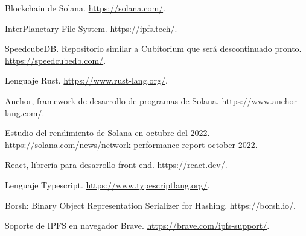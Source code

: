 
\begin{thebibliography}{99}

Blockchain de Solana. \url{https://solana.com/}.

InterPlanetary File System. \url{https://ipfs.tech/}.

SpeedcubeDB. Repositorio similar a Cubitorium que será descontinuado pronto. \url{https://speedcubedb.com/}.

Lenguaje Rust. \url{https://www.rust-lang.org/}.

Anchor, framework de desarrollo de programas de Solana. \url{https://www.anchor-lang.com/}.

Estudio del rendimiento de Solana en octubre del 2022. \url{https://solana.com/news/network-performance-report-october-2022}.

React, librería para desarrollo front-end. \url{https://react.dev/}.

Lenguaje Typescript. \url{https://www.typescriptlang.org/}.

Borsh: Binary Object Representation Serializer for Hashing. \url{https://borsh.io/}.

Soporte de IPFS en navegador Brave. \url{https://brave.com/ipfs-support/}.

\end{thebibliography}